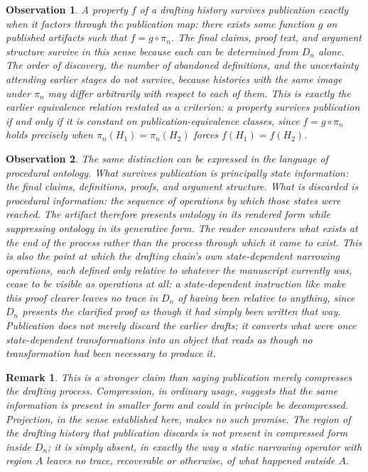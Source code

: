 \documentclass[11pt]{article}
\newtheorem{remark}{Remark}
\newtheorem{observation}{Observation}
\begin{document}
\begin{observation}
A property $f$ of a drafting history survives publication exactly when it factors through the publication map: there exists some function $g$ on published artifacts such that $f = g \circ \pi_n$. The final claims, proof text, and argument structure survive in this sense because each can be determined from $D_n$ alone. The order of discovery, the number of abandoned definitions, and the uncertainty attending earlier stages do not survive, because histories with the same image under $\pi_n$ may differ arbitrarily with respect to each of them. This is exactly the earlier equivalence relation restated as a criterion: a property survives publication if and only if it is constant on publication-equivalence classes, since $f = g \circ \pi_n$ holds precisely when $\pi_n(H_1) = \pi_n(H_2)$ forces $f(H_1) = f(H_2)$.
\end{observation}

\begin{observation}
The same distinction can be expressed in the language of procedural ontology. What survives publication is principally state information: the final claims, definitions, proofs, and argument structure. What is discarded is procedural information: the sequence of operations by which those states were reached. The artifact therefore presents ontology in its rendered form while suppressing ontology in its generative form. The reader encounters what exists at the end of the process rather than the process through which it came to exist. This is also the point at which the drafting chain's own state-dependent narrowing operations, each defined only relative to whatever the manuscript currently was, cease to be visible as operations at all: a state-dependent instruction like \emph{make this proof clearer} leaves no trace in $D_n$ of having been relative to anything, since $D_n$ presents the clarified proof as though it had simply been written that way. Publication does not merely discard the earlier drafts; it converts what were once state-dependent transformations into an object that reads as though no transformation had been necessary to produce it.
\end{observation}

\begin{remark}
This is a stronger claim than saying publication merely compresses the drafting process. Compression, in ordinary usage, suggests that the same information is present in smaller form and could in principle be decompressed. Projection, in the sense established here, makes no such promise. The region of the drafting history that publication discards is not present in compressed form inside $D_n$; it is simply absent, in exactly the way a static narrowing operator with region $A$ leaves no trace, recoverable or otherwise, of what happened outside $A$.
\end{remark}
\end{document}
